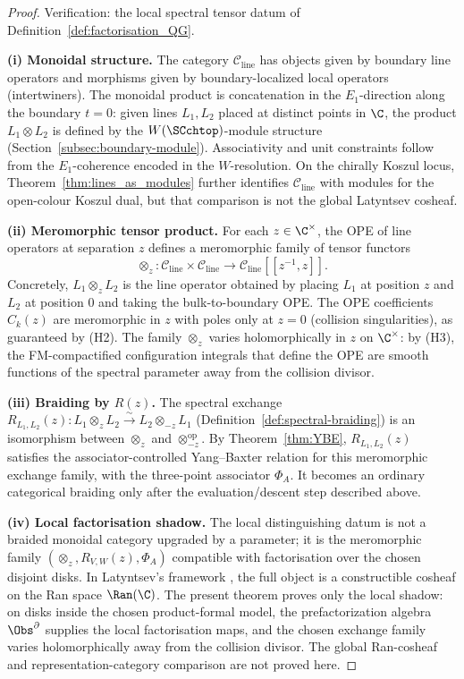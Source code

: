 \begin{proof}
Verification: the local spectral tensor datum of
Definition~\ref{def:factorisation_QG}.

\medskip
\noindent\textbf{(i) Monoidal structure.}
The category $\mathcal{C}_{\mathrm{line}}$ has objects given by
boundary line operators and morphisms given by boundary-localized local
operators (intertwiners). The monoidal product is concatenation in the
$E_1$-direction along the boundary $t=0$: given lines $L_1,L_2$
placed at distinct points in $\C$, the product $L_1\otimes L_2$ is
defined by the $W(\SCchtop)$-module structure
(Section~\ref{subsec:boundary-module}). Associativity and unit
constraints follow from the \(E_1\)-coherence encoded in the
\(W\)-resolution. On the chirally Koszul locus,
Theorem~\ref{thm:lines_as_modules} further identifies
\(\mathcal C_{\mathrm{line}}\) with modules for the open-colour
Koszul dual, but that comparison is not the global Latyntsev
cosheaf.

\medskip
\noindent\textbf{(ii) Meromorphic tensor product.}
For each $z \in \C^\times$, the OPE of line operators at separation $z$ defines a meromorphic family of tensor functors
\[
\otimes_z \colon \mathcal{C}_{\mathrm{line}} \times \mathcal{C}_{\mathrm{line}} \longrightarrow \mathcal{C}_{\mathrm{line}}[[z^{-1}, z]].
\]
Concretely, $L_1 \otimes_z L_2$ is the line operator obtained by placing $L_1$ at position $z$ and $L_2$ at position $0$ and taking the bulk-to-boundary OPE. The OPE coefficients $C_k(z)$ are meromorphic in $z$ with poles only at $z = 0$ (collision singularities), as guaranteed by (H2). The family $\otimes_z$ varies holomorphically in $z$ on $\C^\times$: by (H3), the FM-compactified configuration integrals that define the OPE are smooth functions of the spectral parameter away from the collision divisor.

\medskip
\noindent\textbf{(iii) Braiding by $R(z)$.}
The spectral exchange
$R_{L_1,L_2}(z)\colon L_1\otimes_z L_2\xrightarrow{\sim}
L_2\otimes_{-z}L_1$ (Definition~\ref{def:spectral-braiding}) is an
isomorphism between \(\otimes_z\) and
\(\otimes_{-z}^{\mathrm{op}}\). By Theorem~\ref{thm:YBE},
\(R_{L_1,L_2}(z)\) satisfies the associator-controlled
Yang--Baxter relation for this meromorphic exchange family, with the
three-point associator \(\Phi_A\). It becomes an ordinary categorical
braiding only after the evaluation/descent step described above.

\medskip
\noindent\textbf{(iv) Local factorisation shadow.}
The local distinguishing datum is not a braided monoidal category
upgraded by a parameter; it is the meromorphic family
\((\otimes_z,R_{V,W}(z),\Phi_A)\) compatible with factorisation over
the chosen disjoint disks. In Latyntsev's framework \cite{Lat23}, the
full object is a constructible cosheaf on the Ran space \(\Ran(\C)\).
The present theorem proves only the local shadow: on disks inside the
chosen product-formal model, the prefactorization algebra
\(\Obs^\partial\) supplies the local factorisation maps, and the chosen
exchange family varies holomorphically away from the collision divisor.
The global Ran-cosheaf and representation-category comparison are not
proved here.
\end{proof}

